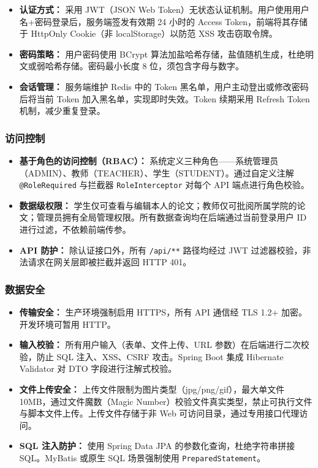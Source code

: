 \documentclass{../../softeng}
\begin{document}
{\begin{itemize}
    \item \textbf{认证方式：} 采用 JWT（JSON Web Token）无状态认证机制。用户使用用户名+密码登录后，服务端签发有效期 24 小时的 Access Token，前端将其存储于 HttpOnly Cookie（非 localStorage）以防范 XSS 攻击窃取令牌。
    \item \textbf{密码策略：} 用户密码使用 BCrypt 算法加盐哈希存储，盐值随机生成，杜绝明文或弱哈希存储。密码最小长度 8 位，须包含字母与数字。
    \item \textbf{会话管理：} 服务端维护 Redis 中的 Token 黑名单，用户主动登出或修改密码后将当前 Token 加入黑名单，实现即时失效。Token 续期采用 Refresh Token 机制，减少重复登录。
\end{itemize}

\subsubsection{访问控制}

\begin{itemize}
    \item \textbf{基于角色的访问控制（RBAC）：} 系统定义三种角色——系统管理员（ADMIN）、教师（TEACHER）、学生（STUDENT）。通过自定义注解 \texttt{@RoleRequired} 与拦截器 \texttt{RoleInterceptor} 对每个 API 端点进行角色校验。
    \item \textbf{数据级权限：} 学生仅可查看与编辑本人的论文；教师仅可批阅所属学院的论文；管理员拥有全局管理权限。所有数据查询均在后端通过当前登录用户 ID 进行过滤，不依赖前端传参。
    \item \textbf{API 防护：} 除认证接口外，所有 \texttt{/api/**} 路径均经过 JWT 过滤器校验，非法请求在网关层即被拦截并返回 HTTP 401。
\end{itemize}

\subsubsection{数据安全}

\begin{itemize}
    \item \textbf{传输安全：} 生产环境强制启用 HTTPS，所有 API 通信经 TLS 1.2+ 加密。开发环境可暂用 HTTP。
    \item \textbf{输入校验：} 所有用户输入（表单、文件上传、URL 参数）在后端进行二次校验，防止 SQL 注入、XSS、CSRF 攻击。Spring Boot 集成 Hibernate Validator 对 DTO 字段进行注解式校验。
    \item \textbf{文件上传安全：} 上传文件限制为图片类型（jpg/png/gif），最大单文件 10MB，通过文件魔数（Magic Number）校验文件真实类型，禁止可执行文件与脚本文件上传。上传文件存储于非 Web 可访问目录，通过专用接口代理访问。
    \item \textbf{SQL 注入防护：} 使用 Spring Data JPA 的参数化查询，杜绝字符串拼接 SQL。MyBatis 或原生 SQL 场景强制使用 \texttt{PreparedStatement}。
\end{itemize}

}
\end{document}
